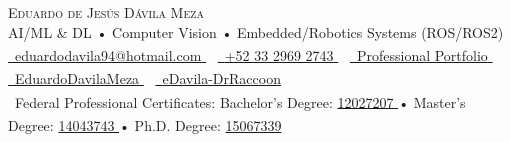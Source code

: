 \documentclass[legalpaper,10pt]{article} %
\newcommand{\ExternalLink}{\textcolor{maincolor}{\scriptsize\textsuperscript{\faExternalLink*}}}
\begin{document}
\begin{center}
    {\LARGE \scshape Eduardo de Jesús Dávila Meza} \\ \vspace{1pt} %
    \small AI/ML \& DL • Computer Vision • Embedded/Robotics Systems (ROS/ROS2) \\ %
    \vspace{2pt}%
    \footnotesize \href{mailto:eduardodavila94@hotmail.com}{\faEnvelope\  {eduardodavila94@hotmail.com} \ExternalLink} ~ 
    \href{https://wa.me/qr/DOKPRLEDLX77N1}{\faWhatsapp\ {+52 33 2969 2743} \ExternalLink} ~ 
    \href{https://edavila-drraccoon.github.io/portfolio_site/}{\faBriefcase\ {Professional Portfolio} \ExternalLink}  ~ 
    \href{https://www.linkedin.com/in/EduardoDavilaMeza/}{\faLinkedin\ {EduardoDavilaMeza} \ExternalLink}  ~
    \href{https://github.com/eDavila-DrRaccoon/}{\faGithub\ {eDavila-DrRaccoon} \ExternalLink} \\ \vspace{1pt} 
    \faGraduationCap\ Federal Professional Certificates: Bachelor's Degree: \href{https://cedulaprofesional.sep.gob.mx/cedula/indexAvanzada.action?idCedula=12027207&idProfesionista=12095369&token=F1E4F2D34C7A333C90517CA80AB1DB69999A4B8B}{12027207 \ExternalLink} • Master's Degree: \href{https://cedulaprofesional.sep.gob.mx/cedula/indexAvanzada.action?idCedula=14043743&idProfesionista=14115164&token=CB0863B7F0A46D831C2C3DC4A95E539B32668E3C}{14043743 \ExternalLink} • Ph.D. Degree: \href{https://cedulaprofesional.sep.gob.mx/cedula/indexAvanzada.action?idCedula=15067339&idProfesionista=15140505&token=17C9CA664BAAE1F40541558FFDF476D9C062828C}{15067339 \ExternalLink} \vspace{-8pt}
\end{center}


\end{document}
